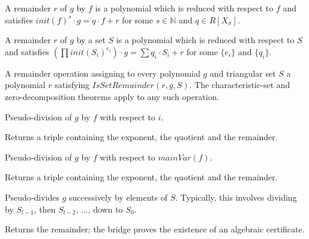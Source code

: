 \begin{definition}
    \label{def:IsRemainder}
    \leanok
    A remainder $r$ of $g$ by $f$ is a polynomial which is reduced with respect to $f$ and
    satisfies $init(f)^s \cdot g = q \cdot f + r$ for some $s \in \mathbb{N}$ and $q \in R[X_{\sigma}]$.
\end{definition}

\begin{definition}
    \label{def:IsSetRemainder}
    \leanok
    A remainder $r$ of $g$ by a set $S$ is a polynomial which is reduced with respect to $S$ and
    satisfies $(\prod init(S_i)^{e_i}) \cdot g = \sum q_i \cdot S_i + r$ for some $\{e_i\}$ and $\{q_i\}$.
\end{definition}

\begin{definition}
    \label{def:PseudoDivisionSpec}
    \leanok
    A remainder operation assigning to every polynomial $g$ and triangular set $S$
    a polynomial $r$ satisfying $IsSetRemainder(r,g,S)$.
    The characteristic-set and zero-decomposition theorems apply to any such operation.
\end{definition}

\begin{definition}
    \label{def:pseudoOf}
    \leanok
    Pseudo-division of $g$ by $f$ with respect to $i$.

    Returns a triple containing the exponent, the quotient and the remainder.
\end{definition}

\begin{definition}
    \label{def:pseudo}
    \leanok
    Pseudo-division of $g$ by $f$ with respect to $mainVar(f)$.

    Returns a triple containing the exponent, the quotient and the remainder.
\end{definition}

\begin{definition}
    \label{def:setPseudo}
    \leanok
    Pseudo-divides $g$ successively by elements of $S$.
    Typically, this involves dividing by $S_{l-1}$, then $S_{l-2}$, ..., down to $S_0$.

    Returns the remainder; the bridge proves the existence of an algebraic certificate.
\end{definition}


